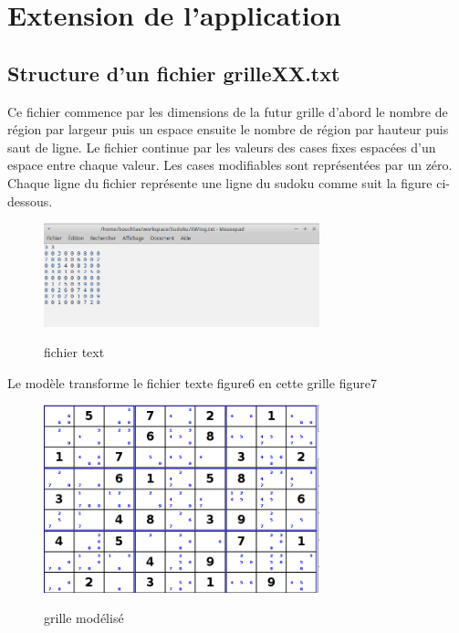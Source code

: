 \newpage
\section{Extension de l’application}
\subsection{Structure d'un fichier grilleXX.txt}
Ce fichier commence  par les dimensions de la futur grille d’abord le nombre de région par 
largeur puis un espace ensuite le nombre de région par hauteur puis saut de ligne.
Le fichier continue par les valeurs des cases fixes espacées d’un espace entre chaque valeur. 
Les cases modifiables sont représentées par un zéro. Chaque ligne du fichier représente une 
ligne du sudoku comme suit la figure ci-dessous.
\begin{figure}[ht]
  \caption{\label{annexe1} fichier text}
  \includegraphics [width=80mm]{images/Fichier_text.png} \\[0.5cm]
\end{figure}

Le modèle transforme le fichier texte figure6 en cette grille figure7\\

\begin{figure}[ht]
  \caption{\label{annexe1} grille modélisé}
  \includegraphics [width=80mm]{images/fichier_type.png} \\[0.5cm]
\end{figure}
\newpage
